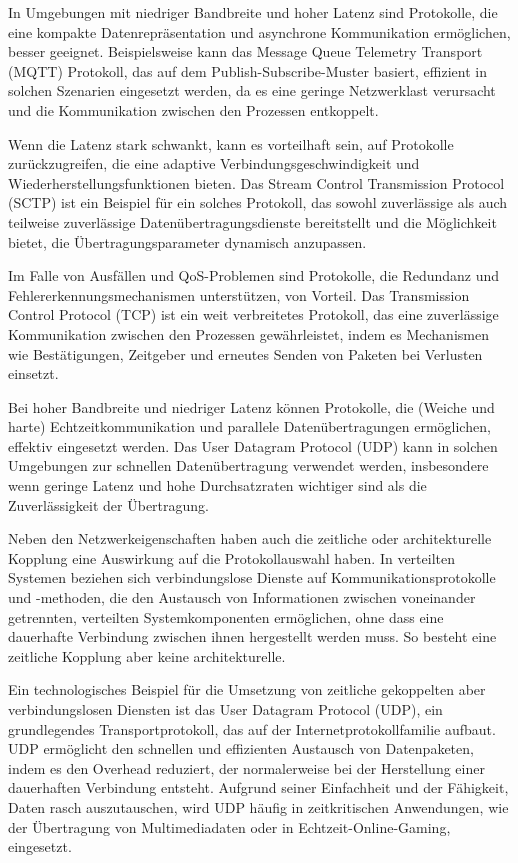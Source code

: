 In Umgebungen mit niedriger Bandbreite und hoher Latenz sind Protokolle, die eine kompakte Datenrepräsentation und asynchrone Kommunikation ermöglichen, besser geeignet. Beispielsweise kann das Message Queue Telemetry Transport (MQTT) Protokoll, das auf dem Publish-Subscribe-Muster basiert, effizient in solchen Szenarien eingesetzt werden, da es eine geringe Netzwerklast verursacht und die Kommunikation zwischen den Prozessen entkoppelt.

Wenn die Latenz stark schwankt, kann es vorteilhaft sein, auf Protokolle zurückzugreifen, die eine adaptive Verbindungsgeschwindigkeit und Wiederherstellungsfunktionen bieten. Das Stream Control Transmission Protocol (SCTP) ist ein Beispiel für ein solches Protokoll, das sowohl zuverlässige als auch teilweise zuverlässige Datenübertragungsdienste bereitstellt und die Möglichkeit bietet, die Übertragungsparameter dynamisch anzupassen.

Im Falle von Ausfällen und QoS-Problemen sind Protokolle, die Redundanz und Fehlererkennungsmechanismen unterstützen, von Vorteil. Das Transmission Control Protocol (TCP) ist ein weit verbreitetes Protokoll, das eine zuverlässige Kommunikation zwischen den Prozessen gewährleistet, indem es Mechanismen wie Bestätigungen, Zeitgeber und erneutes Senden von Paketen bei Verlusten einsetzt.

Bei hoher Bandbreite und niedriger Latenz können Protokolle, die (Weiche und harte) Echtzeitkommunikation und parallele Datenübertragungen ermöglichen, effektiv eingesetzt werden. Das User Datagram Protocol (UDP) kann in solchen Umgebungen zur schnellen Datenübertragung verwendet werden, insbesondere wenn geringe Latenz und hohe Durchsatzraten wichtiger sind als die Zuverlässigkeit der Übertragung.


Neben den Netzwerkeigenschaften haben auch die zeitliche oder architekturelle Kopplung eine Auswirkung auf die Protokollauswahl haben. 
In verteilten Systemen beziehen sich verbindungslose Dienste auf Kommunikationsprotokolle und -methoden, die den Austausch von Informationen zwischen voneinander getrennten, verteilten Systemkomponenten ermöglichen, ohne dass eine dauerhafte Verbindung zwischen ihnen hergestellt werden muss. So besteht eine zeitliche Kopplung aber keine architekturelle. 

Ein technologisches Beispiel für die Umsetzung von zeitliche gekoppelten aber verbindungslosen Diensten ist das User Datagram Protocol (UDP), ein grundlegendes Transportprotokoll, das auf der Internetprotokollfamilie aufbaut. UDP ermöglicht den schnellen und effizienten Austausch von Datenpaketen, indem es den Overhead reduziert, der normalerweise bei der Herstellung einer dauerhaften Verbindung entsteht. Aufgrund seiner Einfachheit und der Fähigkeit, Daten rasch auszutauschen, wird UDP häufig in zeitkritischen Anwendungen, wie der Übertragung von Multimediadaten oder in Echtzeit-Online-Gaming, eingesetzt.

